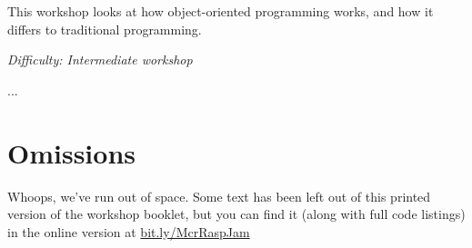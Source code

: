 %
%
%

\newif\ifprint
\printtrue



\newcommand{\workshopTitle}{Workshop 13: Objects}

\newcommand{\workshopAuthor}{Jack Kelly}



	
	
	This workshop looks at how object-oriented programming works, and how it differs to traditional programming.
	
	\textit{Difficulty: Intermediate workshop}

	\ifprint
		\renewcommand{\baselinestretch}{0.6}\normalsize
		\tableofcontents
		\renewcommand{\baselinestretch}{1.0}\normalsize
	\else
		\tableofcontents
	\fi
	
	
	
		\webclearpage
	
	
		\webclearpage
		
	
	
	\ifprint
	\else
		
	\fi
		\webclearpage
	
	
		\webclearpage
	
	\ifprint
		...
	
		\section*{Omissions}
			Whoops, we've run out of space. Some text has been left out of this printed version of the workshop booklet, but you can find it (along with full code listings) in the online version at \mbox{\href{https://drive.google.com/open?id=0B_1SFjX_5JrmfnhpX0pPRXl6bmJNal8zdUxMeWZOdjJyZVdzU3V6UnBGdlVIMENtbFFkbVk}{bit.ly/McrRaspJam}}
	\else
		\onecolumn
		
		\begin{appendix}
			
		\end{appendix}
	\fi

